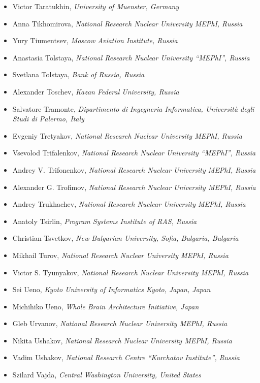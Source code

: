\documentclass[10pt,fleqn,openany]{book} %
\begin{document}
\begin{itemize}
		\item Victor Taratukhin, \textit{University of Muenster, Germany}
		\item Anna Tikhomirova, \textit{National Research Nuclear University MEPhI, Russia}
		\item Yury Tiumentsev, \textit{Moscow Aviation Institute, Russia}
		\item Anastasia Tolstaya, \textit{National Research Nuclear University ``MEPhI'', Russia}
		\item Svetlana Tolstaya, \textit{Bank of Russia, Russia}
		\item Alexander Toschev, \textit{Kazan Federal University, Russia}
		\item Salvatore Tramonte, \textit{Dipartimento di Ingegneria Informatica, Università degli Studi di Palermo, Italy}
		\item Evgeniy Tretyakov, \textit{National Research Nuclear University MEPhI, Russia}
		\item Vsevolod Trifalenkov, \textit{National Research Nuclear University ``MEPhI'', Russia}
		\item Andrey V. Trifonenkov, \textit{National Research Nuclear University MEPhI, Russia}
		\item Alexander G. Trofimov, \textit{National Research Nuclear University MEPhI, Russia}
		\item Andrey Trukhachev, \textit{National Research Nuclear University MEPhI, Russia}
		\item Anatoly Tsirlin, \textit{Program Systems Institute of RAS, Russia}
		\item Christian Tsvetkov, \textit{New Bulgarian University, Sofia, Bulgaria, Bulgaria}
		\item Mikhail Turov, \textit{National Research Nuclear University MEPhI, Russia}
		\item Victor S. Tyunyakov, \textit{National Research Nuclear University MEPhI, Russia}
		\item Sei Ueno, \textit{Kyoto University of Informatics Kyoto, Japan, Japan}
		\item Michihiko Ueno, \textit{Whole Brain Architecture Initiative, Japan}
		\item Gleb Urvanov, \textit{National Research Nuclear University MEPhI, Russia}
		\item Nikita Ushakov, \textit{National Research Nuclear University MEPhI, Russia}
		\item Vadim Ushakov, \textit{National Research Centre ``Kurchatov Institute'', Russia}
		\item Szilard Vajda, \textit{Central Washington University, United States}

\end{itemize}
\end{document}
